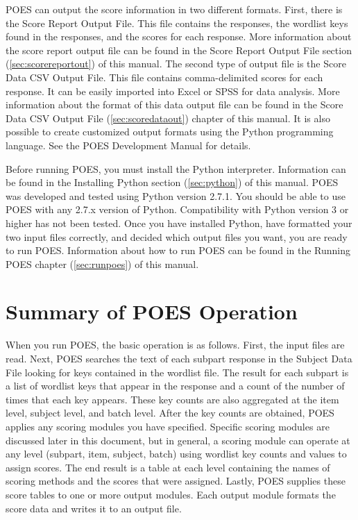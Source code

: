 \documentclass[11pt]{article}
\numberwithin{figure}{section}
\numberwithin{table}{section}
\begin{document}
POES can output the score information in two different formats.  First, there is the Score Report Output File.  This file contains the responses, the wordlist keys found in the responses, and the scores for each response.  More information about the score report output file can be found in the Score Report Output File section (\ref{sec:scorereportout}) of this manual.  The second type of output file is the Score Data CSV Output File.  This file contains comma-delimited scores for each response.  It can be easily imported into Excel or SPSS for data analysis.  More information about the format of this data output file can be found in the Score Data CSV Output File (\ref{sec:scoredataout}) chapter of this manual.  It is also possible to create customized output formats using the Python programming language.  See the POES Development Manual for details.

Before running POES, you must install the Python interpreter.  
Information can be found in the Installing Python section (\ref{sec:python}) of this manual.  POES was developed and tested using Python version 2.7.1.  You should be able to use POES with any 2.7.x version of Python.  Compatibility with Python version 3 or higher has not been tested.  Once you have installed Python, have formatted your two input files correctly, and decided which output files you want, you are ready to run POES.  Information about how to run POES can be found in the Running POES chapter (\ref{sec:runpoes}) of this manual.

\section{Summary of POES Operation}
\label{sec:poesop}
When you run POES, the basic operation is as follows.  First, the input files are read.  Next, POES searches the text of each subpart response in the Subject Data File looking for keys contained in the wordlist file.  The result for each subpart is a list of wordlist keys that appear in the response and a count of the number of times that each key appears.  These key counts are also aggregated at the item level, subject level, and batch level.  After the key counts are obtained, POES applies any scoring modules you have specified.  Specific scoring modules are discussed later in this document, but in general, a scoring module can operate at any level (subpart, item, subject, batch) using wordlist key counts and values to assign scores.  The end result is a table at each level containing the names of scoring methods and the scores that were assigned.  Lastly, POES supplies these score tables to one or more output modules.  Each output module formats the score data and writes it to an output file.
\end{document}
